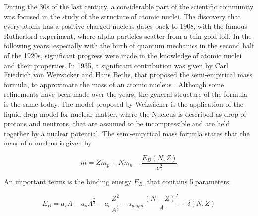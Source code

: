 
During the 30s of the last century, a considerable part of the scientific community was focused in the study of the structure of atomic nuclei. The discovery that every atoms has a positive charged nucleus dates back to 1908, with the famous Rutherford experiment, where alpha particles scatter from a thin gold foil. In the following years, especially with the birth of quantum mechanics in the second half of the 1920s, significant progress were made in the knowledge of atomic nuclei and their properties. In 1935, a significant contribution was given by Carl Friedrich von Weizsäcker and Hans Bethe, that proposed the semi-empirical mass formula, to approximate the mass of an atomic nucleus \cite{Bethe:1936zz}. Although some refinements have been made over the years, the general structure of the formula is the same today. 
The model proposed by Weizsäcker is the application of the liquid-drop model for nuclear matter, where the Nucleus is described as drop of protons and neutrons, that are assumed to be incompressible and are held together by a nuclear potential. The semi-empirical mass formula states that the mass of a nucleus is given by 

\begin{equation}
m = Zm_{p} + Nm_{n} - \frac{E_{B}(N,Z)}{c^{2}}
\end{equation}

An important terms is the binding energy $E_{B}$, that contains 5 parameters:

\begin{equation}
E_{B} = a_{V}A -  a_{s}A^{\frac{2}{3}} - a_{c}\dfrac{Z^{2}}{A^{\frac{1}{3}}} -a_{asym}\dfrac{(N - Z)^{2}}{A} + \delta(N,Z)
\end{equation}

